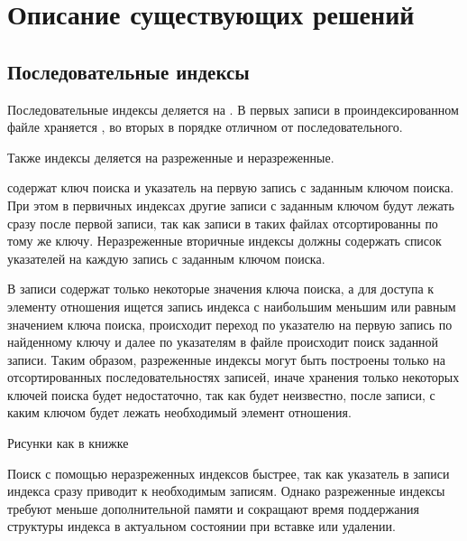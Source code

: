 \chapter{Описание существующих решений}

\section{Последовательные индексы}

Последовательные индексы деляется на . В первых записи в проиндексированном
файле храняется , во
вторых в порядке отличном от последовательного.


Также индексы деляется на разреженные и неразреженные.

 содержат ключ поиска и указатель на первую запись с
заданным ключом поиска. При этом в первичных индексах другие записи с заданным
ключом будут лежать сразу после первой записи, так как записи в таких файлах
отсортированны по тому же ключу. Неразреженные вторичные индексы
должны содержать список указателей на каждую запись с заданным ключом поиска.


В  записи содержат только некоторые значения ключа
поиска, а для доступа к элементу отношения ищется запись индекса с наибольшим
меньшим или равным значением ключа поиска, происходит переход по указателю на
первую запись по найденному ключу и далее по указателям в файле происходит поиск
заданной записи. Таким образом, разреженные индексы могут быть построены только
на отсортированных последовательностях записей, иначе хранения только некоторых
ключей поиска будет недостаточно, так как будет неизвестно, после записи, с
каким ключом будет лежать необходимый элемент отношения.

Рисунки как в книжке

Поиск с помощью неразреженных индексов быстрее, так как указатель в записи
индекса сразу приводит к необходимым записям. Однако разреженные индексы требуют
меньше дополнительной памяти и сокращают время поддержания структуры индекса в
актуальном состоянии при вставке или удалении.

